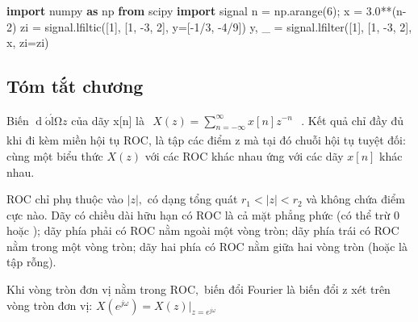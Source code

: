 \documentclass[
  10
]{article}
\newenvironment{Shaded}{}{}
\newcommand{\DecValTok}[1]{\textcolor[rgb]{0.25,0.63,0.44}{#1}}
\newcommand{\FloatTok}[1]{\textcolor[rgb]{0.25,0.63,0.44}{#1}}
\newcommand{\ImportTok}[1]{\textcolor[rgb]{0.00,0.50,0.00}{\textbf{#1}}}
\newcommand{\NormalTok}[1]{#1}
\newcommand{\OperatorTok}[1]{\textcolor[rgb]{0.40,0.40,0.40}{#1}}
\begin{document}
\begin{Shaded}
\begin{Highlighting}[]
\ImportTok{import}\NormalTok{ numpy }\ImportTok{as}\NormalTok{ np}
\ImportTok{from}\NormalTok{ scipy }\ImportTok{import}\NormalTok{ signal}
\NormalTok{n }\OperatorTok{=}\NormalTok{ np.arange(}\DecValTok{6}\NormalTok{)}\OperatorTok{;}\NormalTok{ x }\OperatorTok{=} \FloatTok{3.0}\OperatorTok{**}\NormalTok{(n}\OperatorTok{{-}}\DecValTok{2}\NormalTok{)}
\NormalTok{zi }\OperatorTok{=}\NormalTok{ signal.lfiltic([}\DecValTok{1}\NormalTok{], [}\DecValTok{1}\NormalTok{, }\OperatorTok{{-}}\DecValTok{3}\NormalTok{, }\DecValTok{2}\NormalTok{], y}\OperatorTok{=}\NormalTok{[}\OperatorTok{{-}}\DecValTok{1}\OperatorTok{/}\DecValTok{3}\NormalTok{, }\OperatorTok{{-}}\DecValTok{4}\OperatorTok{/}\DecValTok{9}\NormalTok{])}
\NormalTok{y, \_ }\OperatorTok{=}\NormalTok{ signal.lfilter([}\DecValTok{1}\NormalTok{], [}\DecValTok{1}\NormalTok{, }\OperatorTok{{-}}\DecValTok{3}\NormalTok{, }\DecValTok{2}\NormalTok{], x, zi}\OperatorTok{=}\NormalTok{zi) }
\end{Highlighting}
\end{Shaded}

\subsection{Tóm tắt chương}\label{tuxf3m-tux1eaft-chux1b0ux1a1ng-4}

Biến
\(\operatorname { d } \acute { \boldsymbol { \mathrm { o } } } \acute { \boldsymbol { \mathrm { l } } } \boldsymbol { \mathrm { \Omega } } z\)
của dãy x{[}n{]} là
\(\begin{array} { r } { X ( z ) = \sum _ { n = - \infty } ^ { \infty } x [ n ] z ^ { - n } } \end{array}\)
. Kết quả chỉ đầy đủ khi đi kèm miền hội tụ ROC, là tập các điểm z mà
tại đó chuỗi hội tụ tuyệt đối: cùng một biểu thức \(X ( z )\) với các
ROC khác nhau ứng với các dãy \(x [ n ]\) khác nhau.

ROC chỉ phụ thuộc vào \(| z | ,\) có dạng tổng quát
\(r _ { 1 } < | z | < r _ { 2 }\) và không chứa điểm cực nào. Dãy có
chiều dài hữu hạn có ROC là cả mặt phẳng phức (có thể trừ 0 hoặc ); dãy
phía phải có ROC nằm ngoài một vòng tròn; dãy phía trái có ROC nằm trong
một vòng tròn; dãy hai phía có ROC nằm giữa hai vòng tròn (hoặc là tập
rỗng).

Khi vòng tròn đơn vị nằm trong \(\mathrm { R O C } ,\) biến đổi Fourier
là biến đổi z xét trên vòng tròn đơn vị:
\(X ( e ^ { j \omega } ) = X ( z ) | _ { z = e ^ { j \omega } }\)
\end{document}
